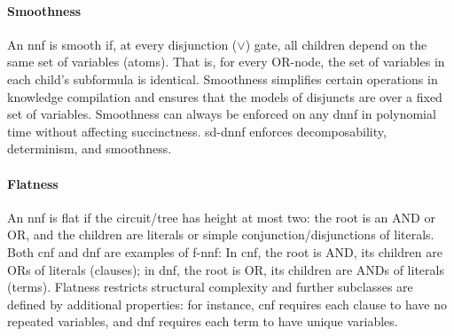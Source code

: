 \paragraph{Smoothness}
An \acrshort{nnf} is smooth if, at every disjunction ($\lor$) gate, all children depend on the same set of variables (atoms). That is, for every OR-node, the set of variables in each child’s subformula is identical. Smoothness simplifies certain operations in knowledge compilation and ensures that the models of disjuncts are over a fixed set of variables. Smoothness can always be enforced on any \acrshort{dnnf} in polynomial time without affecting succinctness. \acrfull{sd-dnnf} enforces decomposability, determinism, and smoothness.

\paragraph{Flatness}
An \acrshort{nnf} is flat if the circuit/tree has height at most two: the root is an AND or OR, and the children are literals or simple conjunction/disjunctions of literals. Both \acrshort{cnf} and \acrshort{dnf} are examples of \acrfull{f-nnf}: In \acrshort{cnf}, the root is AND, its children are ORs of literals (clauses); in \acrshort{dnf}, the root is OR, its children are ANDs of literals (terms). Flatness restricts structural complexity and further subclasses are defined by additional properties: for instance, \acrshort{cnf} requires each clause to have no repeated variables, and \acrshort{dnf} requires each term to have unique variables.



